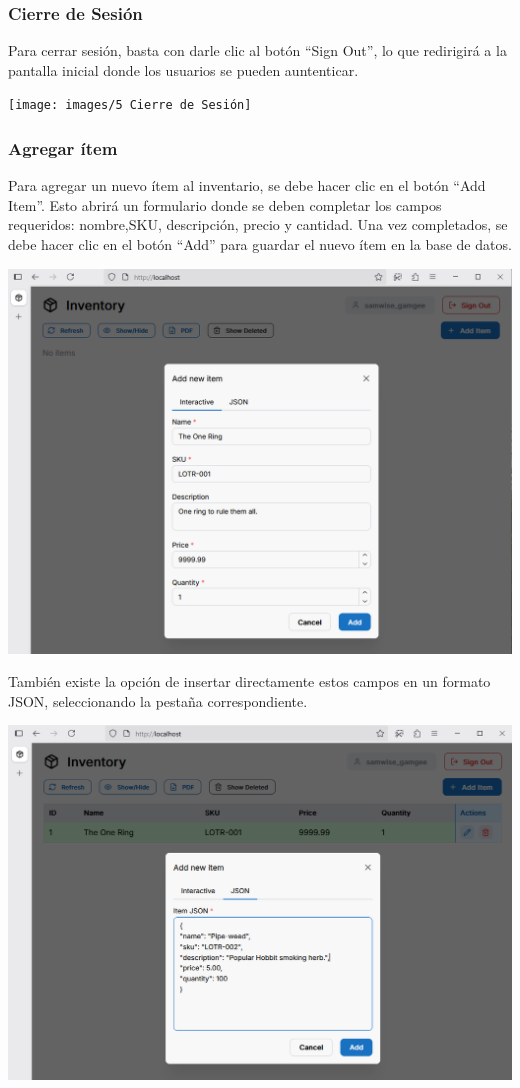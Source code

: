 \subsubsection{Cierre de Sesión}

Para cerrar sesión, basta con darle clic al botón “Sign Out”, lo que redirigirá a la pantalla inicial donde los usuarios se pueden auntenticar.

\texttt{[image: images/5 Cierre de Sesión]}

\subsubsection{Agregar ítem}

Para agregar un nuevo ítem al inventario, se debe hacer clic en el botón “Add Item”. Esto abrirá un formulario donde se deben completar los campos requeridos: nombre,SKU, descripción, precio y cantidad. Una vez completados, se debe hacer clic en el botón “Add” para guardar el nuevo ítem en la base de datos.

\includegraphics[width=\textwidth]{images/6 Agregar}

También existe la opción de insertar directamente estos campos en un formato JSON, seleccionando la pestaña correspondiente.

\includegraphics[width=\textwidth]{images/7 Agregar JSON}

